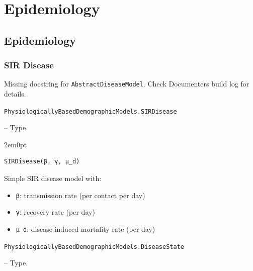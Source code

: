 \chapter{Epidemiology}


\section{Epidemiology}



\label{13410090784046193606}{}


\subsection{SIR Disease}



\label{11279633000497615863}{}


\begin{tcolorbox}[toptitle=-1mm,bottomtitle=1mm,colback=admonition-warning!50!white,colframe=admonition-warning,title=\textbf{Missing docstring.}]
Missing docstring for \texttt{AbstractDiseaseModel}. Check Documenter{\textquotesingle}s build log for details.

\end{tcolorbox}

\hypertarget{11222540782336789558}{\texttt{PhysiologicallyBasedDemographicModels.SIRDisease}}  -- {Type.}

\begin{adjustwidth}{2em}{0pt}


\begin{verbatim}
SIRDisease(β, γ, μ_d)
\end{verbatim}

Simple SIR disease model with:

\begin{itemize}
\item \texttt{β}: transmission rate (per contact per day)


\item \texttt{γ}: recovery rate (per day)


\item \texttt{μ\_d}: disease-induced mortality rate (per day)

\end{itemize}


\end{adjustwidth}
\hypertarget{12146467917512192412}{\texttt{PhysiologicallyBasedDemographicModels.DiseaseState}}  -- {Type.}

